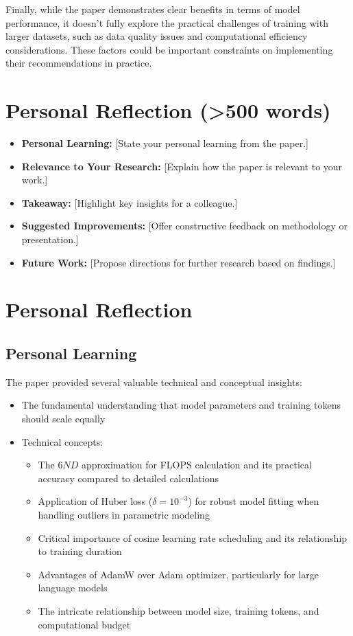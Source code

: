 \documentclass{article}
\begin{document}
Finally, while the paper demonstrates clear benefits in terms of model performance, it doesn't fully explore the practical challenges of training with larger datasets, such as data quality issues and computational efficiency considerations. These factors could be important constraints on implementing their recommendations in practice.


\section*{Personal Reflection (>500 words)}
\vspace{-0.5em}
\begin{itemize}
    \item \textbf{Personal Learning:} [State your personal learning from the paper.]
    \item \textbf{Relevance to Your Research:} [Explain how the paper is relevant to your work.]
    \item \textbf{Takeaway:} [Highlight key insights for a colleague.]
    \item \textbf{Suggested Improvements:} [Offer constructive feedback on methodology or presentation.]
    \item \textbf{Future Work:} [Propose directions for further research based on findings.]
\end{itemize}

\section{Personal Reflection}

\subsection{Personal Learning}
The paper provided several valuable technical and conceptual insights:
\begin{itemize}
    \item The fundamental understanding that model parameters and training tokens should scale equally
    \item Technical concepts:
    \begin{itemize}
        \item The $6ND$ approximation for FLOPS calculation and its practical accuracy compared to detailed calculations
        \item Application of Huber loss ($\delta = 10^{-3}$) for robust model fitting when handling outliers in parametric modeling
        \item Critical importance of cosine learning rate scheduling and its relationship to training duration
        \item Advantages of AdamW over Adam optimizer, particularly for large language models
        \item The intricate relationship between model size, training tokens, and computational budget
    \end{itemize}
\end{itemize}
\end{document}
